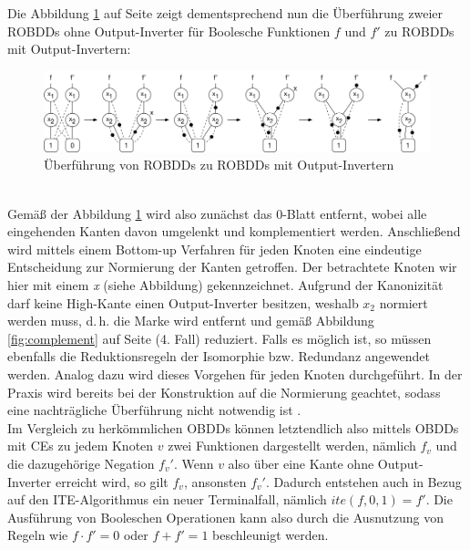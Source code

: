 Die Abbildung \ref{fig:complementTransform} auf Seite \pageref{fig:complementTransform} zeigt dementsprechend nun die Überführung zweier ROBDDs ohne Output-Inverter für Boolesche Funktionen $f$ und $f'$ zu ROBDDs mit Output-Invertern:
\begin{figure}[bth]
	\centering
	\includegraphics[scale=0.4]{./img/complementTransform}
	\caption[Überführung von ROBDDs zu ROBDDs mit Output-Invertern]{Überführung von ROBDDs zu ROBDDs mit Output-Invertern}
	\label{fig:complementTransform}
\end{figure}\\
\noindent
Gemäß der Abbildung \ref{fig:complementTransform} wird also zunächst das 0-Blatt entfernt, wobei alle eingehenden Kanten davon umgelenkt und komplementiert werden. Anschließend wird mittels einem Bottom-up Verfahren für jeden Knoten eine eindeutige Entscheidung zur Normierung der Kanten getroffen. Der betrachtete Knoten wir hier mit einem \textit{x} (siehe Abbildung) gekennzeichnet. Aufgrund der Kanonizität darf keine High-Kante einen Output-Inverter besitzen, weshalb $x_2$ normiert werden muss, d.\,h. die Marke wird entfernt und gemäß Abbildung \ref{fig:complement} auf Seite \pageref{fig:complement} (4. Fall) reduziert. Falls es möglich ist, so müssen ebenfalls die Reduktionsregeln der Isomorphie bzw. Redundanz angewendet werden. Analog dazu wird dieses Vorgehen für jeden Knoten durchgeführt. In der Praxis wird bereits bei der Konstruktion auf die Normierung geachtet, sodass eine nachträgliche Überführung nicht notwendig ist \cite[S.45]{h2002}.\\
Im Vergleich zu herkömmlichen OBDDs können letztendlich also mittels OBDDs mit CEs zu jedem Knoten $v$ zwei Funktionen dargestellt werden, nämlich $f_v$ und die dazugehörige Negation $f_v'$. Wenn $v$ also über eine Kante ohne Output-Inverter erreicht wird, so gilt $f_v$, ansonsten $f_v'$. Dadurch entstehen auch in Bezug auf den ITE-Algorithmus ein neuer Terminalfall, nämlich $ite(f, 0, 1) = f'$. Die Ausführung von Booleschen Operationen kann also durch die Ausnutzung von Regeln wie $f \cdot f' = 0$ oder $f + f' = 1$ beschleunigt werden.\\
